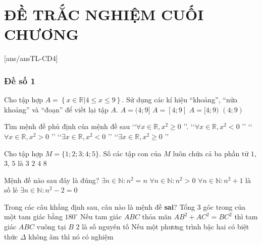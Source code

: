 \section*{ĐỀ TRẮC NGHIỆM CUỐI CHƯƠNG}
[ans/ansTL-CD4]
\setcounter{ex}{0}
\subsubsection{Đề số 1}

\begin{ex}%
	Cho tập hợp $A=\left\{x \in \mathbb{R}|4 \leq x \leq 9\right\}.$ Sử dụng các kí hiệu ``khoảng'', ``nửa khoảng'' và ``đoạn'' để viết lại tập $A$.
	\choice
	{$A=(4;9]$}
	{\True $A=[4;9]$}
	{$A=[4;9)$}
	{$(4;9)$}
\end{ex}

\begin{ex}%
	Tìm mệnh đề phủ định của mệnh đề sau \lq \lq $\forall x \in \mathbb{R},x^2 \geq 0$ \rq \rq.
	\choice
	{\lq \lq $\forall x \in \mathbb{R},x^2<0$ \rq \rq}
	{\lq \lq $\forall x \in \mathbb{R},x^2>0$ \rq \rq}
	{\True \lq \lq $\exists x \in \mathbb{R},x^2<0$ \rq \rq}
	{\lq \lq $\exists x \in \mathbb{R},x^2 \geq 0$ \rq \rq}
\end{ex}

\begin{ex}%
	Cho tập hợp $M=\{1;2;3;4;5\}$. Số các tập con của $M$ luôn chứa cả ba phần tử $1$, $3$, $5$ là
	\choice
	{$3$}
	{$2$}
	{\True $4$}
	{$8$}
\end{ex}

\begin{ex}%
	Mệnh đề nào sau đây là đúng?
	\choice
	{\True $\exists n\in\mathbb{N}: n^2=n$}
	{$\forall n\in\mathbb{N}: n^2>0$}
	{$\forall n\in\mathbb{N}: n^2+1$ là số lẻ}
	{$\exists n\in\mathbb{N}: n^2-2=0$}
\end{ex}

\begin{ex}%
	Trong các câu khẳng định sau, câu nào là mệnh đề \textbf{sai}?
	\choice
	{Tổng $3$ góc trong của một tam giác bằng $180^\circ$}
	{\True Nếu tam giác $ABC$ thỏa mãn $AB^2+AC^2=BC^2$ thì tam giác $ABC$ vuông tại $B$}
	{2 là số nguyên tố}
	{Nếu một phương trình bậc hai có biệt thức $\Delta$ không âm thì nó có nghiệm}
\end{ex}

